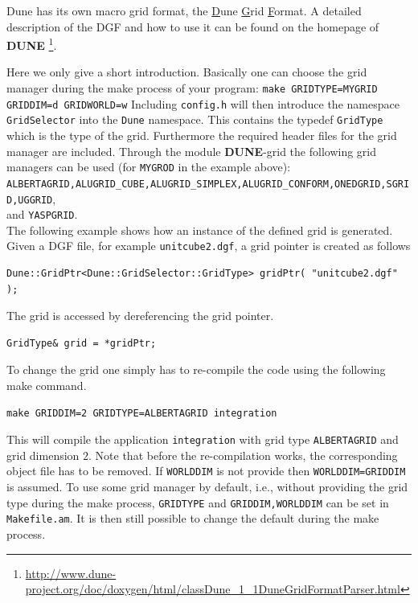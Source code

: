\documentclass[11pt,a4paper,headinclude,footinclude,DIV16,normalheadings]{scrreprt}
\newcommand{\Dune}{{\sf\bfseries DUNE}\xspace}
\begin{document}
Dune has its own macro grid format, the \underline{D}une \underline{G}rid \underline{F}ormat. 
A detailed description of the DGF and how to use it can be found on the
homepage of \Dune%
\footnote{\url{http://www.dune-project.org/doc/doxygen/html/classDune_1_1DuneGridFormatParser.html}}.

Here we only give a short introduction. 
Basically one can choose the grid manager during the make process of
your program:
\lstinline!make GRIDTYPE=MYGRID GRIDDIM=d GRIDWORLD=w!
Including \lstinline!config.h! will then
introduce the namespace \lstinline!GridSelector! into the
\lstinline!Dune! namespace. This contains the typedef
\lstinline!GridType! which is the type of the grid. Furthermore the 
required header files for the grid manager are included.
Through the module \Dune{}-grid the following grid managers can be used
(for \lstinline!MYGROD! in the example above): 
\\
\lstinline!ALBERTAGRID,ALUGRID_CUBE,ALUGRID_SIMPLEX,ALUGRID_CONFORM,ONEDGRID,SGRID,UGGRID!,
\\
and \lstinline!YASPGRID!.
\\
The following example shows how an 
instance of the defined grid is generated. Given a DGF file, for example 
\lstinline!unitcube2.dgf!, a grid pointer is created as follows
\begin{lstlisting}[basicstyle=\ttfamily\scriptsize]
Dune::GridPtr<Dune::GridSelector::GridType> gridPtr( "unitcube2.dgf" );
\end{lstlisting}
The grid is accessed by dereferencing the grid pointer.
\begin{lstlisting}[basicstyle=\ttfamily\scriptsize]
GridType& grid = *gridPtr; 
\end{lstlisting}
To change the grid one simply has to re-compile the code using the following make command.
\begin{lstlisting}[basicstyle=\ttfamily\scriptsize]
make GRIDDIM=2 GRIDTYPE=ALBERTAGRID integration 
\end{lstlisting}
This will compile the application \texttt{integration} with grid type \lstinline!ALBERTAGRID! and grid dimension $2$.
Note that before the re-compilation works, 
the corresponding object file has to be removed.
If \lstinline!WORLDDIM! is not
provide then \lstinline!WORLDDIM=GRIDDIM! is assumed.
To use some grid manager by default, i.e., without providing the grid type
during the make process, \lstinline!GRIDTYPE! and
\lstinline!GRIDDIM,WORLDDIM! can be set in \lstinline!Makefile.am!. It is
then still possible to change the default during the make process. 
\end{document}
